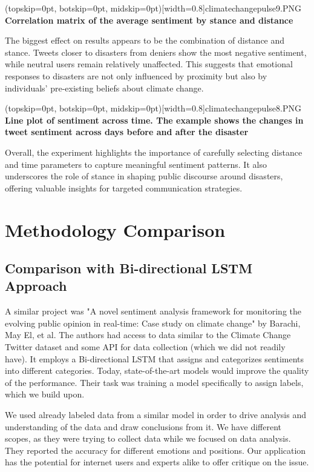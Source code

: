 \documentclass{ieeeaccess}
\begin{document}
\Figure[t!](topskip=0pt, botskip=0pt, midskip=0pt)[width=0.8\columnwidth]{climatechangepulse9.PNG}
{ \textbf{Correlation matrix of the average sentiment by stance and distance}\label{fig7}}

The biggest effect on results appears to be the combination of distance and stance. Tweets closer to disasters from deniers show the most negative sentiment, while neutral users remain relatively unaffected. This suggests that emotional responses to disasters are not only influenced by proximity but also by individuals' pre-existing beliefs about climate change.

\Figure[t!](topskip=0pt, botskip=0pt, midskip=0pt)[width=0.8\columnwidth]{climatechangepulse8.PNG}
{ \textbf{Line plot of sentiment across time. The example shows the changes in tweet sentiment across days before and after the disaster}\label{fig8}}

Overall, the experiment highlights the importance of carefully selecting distance and time parameters to capture meaningful sentiment patterns. It also underscores the role of stance in shaping public discourse around disasters, offering valuable insights for targeted communication strategies.

\section{Methodology Comparison}
\label{sec:methodology_comparison}

\subsection{Comparison with Bi-directional LSTM Approach}
A similar project was "A novel sentiment analysis framework for monitoring the evolving public opinion in real-time: Case study on climate change" by Barachi, May El, et al. The authors had access to data similar to the Climate Change Twitter dataset and some API for data collection (which we did not readily have). It employs a Bi-directional LSTM that assigns and categorizes sentiments into different categories. Today, state-of-the-art models would improve the quality of the performance. Their task was training a model specifically to assign labels, which we build upon.

We used already labeled data from a similar model in order to drive analysis and understanding of the data and draw conclusions from it. We have different scopes, as they were trying to collect data while we focused on data analysis. They reported the accuracy for different emotions and positions. Our application has the potential for internet users and experts alike to offer critique on the issue.
\end{document}
